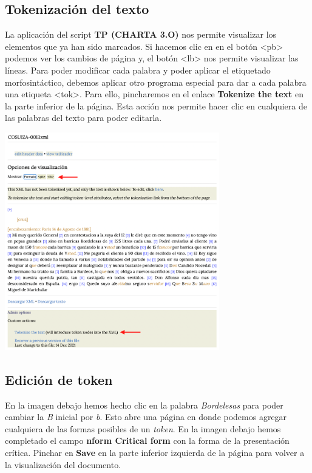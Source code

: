 \documentclass[
]{book}
\begin{document}
\hypertarget{tokenizaciuxf3n-del-texto}{%
\subsection*{Tokenización del texto}\label{tokenizaciuxf3n-del-texto}}

La aplicación del script \textbf{TP (CHARTA 3.O)} nos permite visualizar los elementos que ya han sido marcados. Si hacemos clic en en el botón \textless pb\textgreater{} podemos ver los cambios de página y, el botón \textless lb\textgreater{} nos permite visualizar las líneas. Para poder modificar cada palabra y poder aplicar el etiquetado morfosintáctico, debemos aplicar otro programa especial para dar a cada palabra una etiqueta { \textless tok\textgreater{}}. Para ello, pincharemos en el enlace \textbf{Tokenize the text} en la parte inferior de la página. Esta acción nos permite hacer clic en cualquiera de las palabras del texto para poder editarla.

\includegraphics[width=0.7\textwidth,height=\textheight]{img/tokenize.png}

\hypertarget{ediciuxf3n-de-token}{%
\subsection*{Edición de token}\label{ediciuxf3n-de-token}}

En la imagen debajo hemos hecho clic en la palabra \emph{Bordelesas} para poder cambiar la \emph{B} inicial por \emph{b}. Esto abre una página en donde podemos agregar cualquiera de las formas posibles de un \emph{token}. En la imagen debajo hemos completado el campo \textbf{nform Critical form} con la forma de la presentación crítica. Pinchar en \textbf{Save} en la parte inferior izquierda de la página para volver a la visualización del documento.
\end{document}
